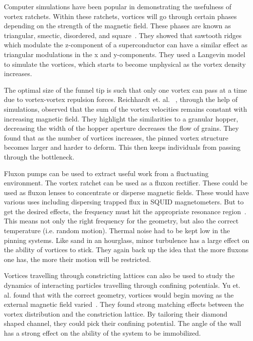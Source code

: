 Computer simulations have been popular in demonstrating the usefulness of vortex ratchets. Within these ratchets, vortices will go through certain phases depending on the strength of the magnetic field. These phases are known as triangular, smectic, disordered, and square~\cite{Lu06}. They showed that sawtooth ridges which modulate the z-component of a superconductor can have a similar effect as triangular modulations in the x and y-components. They used a Langevin model to simulate the vortices, which starts to become unphysical as the vortex density increases.  

The optimal size of the funnel tip is such that only one vortex can pass at a time due to vortex-vortex repulsion forces. Reichhardt et. al.~\cite{Reichhardt10} , through the help of simulations, observed that the sum of the vortex velocities remains constant with increasing magnetic field. They highlight the similarities to a granular hopper, decreasing the width of the hopper aperture decreases the flow of grains. They found that as the number of vortices increases, the pinned vortex structure becomes larger and harder to deform. This then keeps individuals from passing through the bottleneck.

Fluxon pumps can be used to extract useful work from a fluctuating environment. The vortex ratchet can be used as a fluxon rectifier. These could be used as fluxon lenses to concentrate or disperse magnetic fields. These would have various uses including dispersing trapped flux in SQUID magnetometers. But to get the desired effects, the frequency must hit the appropriate resonance region~\cite{Wambaugh99}. This means not only the right frequency for the geometry, but also the correct temperature (i.e. random motion). Thermal noise had to be kept low in the pinning systems. Like sand in an hourglass, minor turbulence has a large effect on the ability of vortices to stick. They again back up the idea that the more fluxons one has, the more their motion will be restricted.

Vortices travelling through constricting lattices can also be used to study the dynamics of interacting particles travelling through confining potentials. Yu et. al. found that with the correct geometry, vortices would begin moving as the external magnetic field varied~\cite{Yu10}. They found strong matching effects between the vortex distribution and the constriction lattice. By tailoring their diamond shaped channel, they could pick their confining potential. The angle of the wall has a strong effect on the ability of the system to be immobilized.

